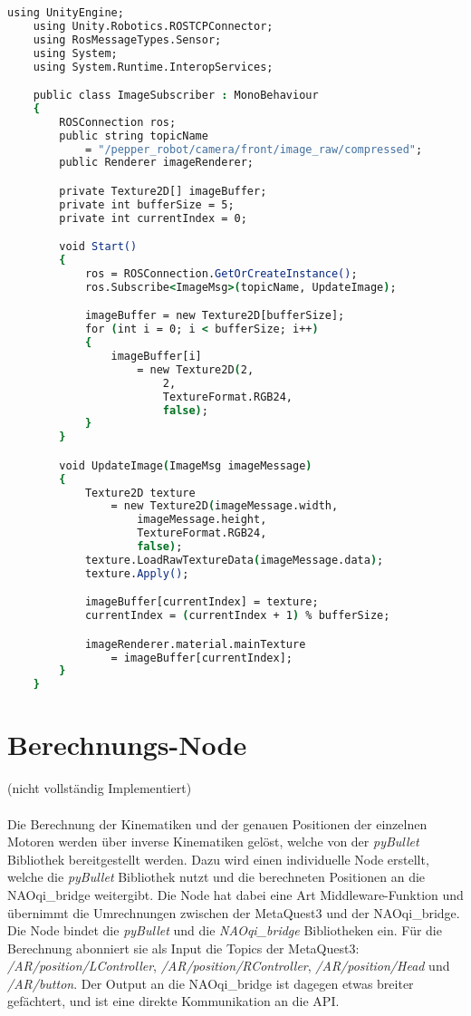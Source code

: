 \begin{lstlisting}[language=csh, caption=Abgreifen der Kamerabilder, label=lst:unity-image-data]
    using UnityEngine;
    using Unity.Robotics.ROSTCPConnector;
    using RosMessageTypes.Sensor;
    using System;
    using System.Runtime.InteropServices;

    public class ImageSubscriber : MonoBehaviour
    {
        ROSConnection ros;
        public string topicName
            = "/pepper_robot/camera/front/image_raw/compressed";
        public Renderer imageRenderer;

        private Texture2D[] imageBuffer;
        private int bufferSize = 5;
        private int currentIndex = 0;

        void Start()
        {
            ros = ROSConnection.GetOrCreateInstance();
            ros.Subscribe<ImageMsg>(topicName, UpdateImage);

            imageBuffer = new Texture2D[bufferSize];
            for (int i = 0; i < bufferSize; i++)
            {
                imageBuffer[i]
                    = new Texture2D(2,
                        2,
                        TextureFormat.RGB24,
                        false);
            }
        }

        void UpdateImage(ImageMsg imageMessage)
        {
            Texture2D texture
                = new Texture2D(imageMessage.width,
                    imageMessage.height,
                    TextureFormat.RGB24,
                    false);
            texture.LoadRawTextureData(imageMessage.data);
            texture.Apply();

            imageBuffer[currentIndex] = texture;
            currentIndex = (currentIndex + 1) % bufferSize;

            imageRenderer.material.mainTexture
                = imageBuffer[currentIndex];
        }
    }
\end{lstlisting}


\section{Berechnungs-Node}\label{sec:Berechnungs-Node}
(nicht vollständig Implementiert)\\\\
Die Berechnung der Kinematiken und der genauen Positionen der einzelnen Motoren werden über inverse Kinematiken gelöst, welche von der \textit{pyBullet} Bibliothek bereitgestellt werden. Dazu wird einen individuelle Node erstellt, welche die \textit{pyBullet} Bibliothek nutzt und die berechneten Positionen an die NAOqi\_bridge weitergibt. Die Node hat dabei eine Art Middleware-Funktion und übernimmt die Umrechnungen zwischen der MetaQuest3 und der NAOqi\_bridge.\\
Die Node bindet die \textit{pyBullet} und die \textit{NAOqi\_bridge} Bibliotheken ein. Für die Berechnung abonniert sie als Input die Topics der MetaQuest3: \textit{/AR/position/LController}, \textit{/AR/position/RController}, \textit{/AR/position/Head} und \textit{/AR/button}. Der Output an die NAOqi\_bridge ist dagegen etwas breiter gefächtert, und ist eine direkte Kommunikation an die \ac{API}.\\

